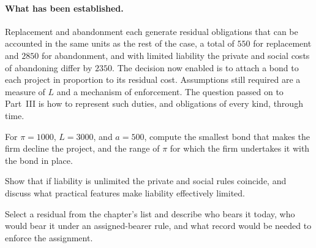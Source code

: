 \paragraph{What has been established.} Replacement and abandonment each generate residual obligations that can be accounted in the same units as the rest of the case, a total of $550$ for replacement and $2850$ for abandonment, and with limited liability the private and social costs of abandoning differ by $2350$. The decision now enabled is to attach a bond to each project in proportion to its residual cost. Assumptions still required are a measure of $L$ and a mechanism of enforcement. The question passed on to Part~III is how to represent such duties, and obligations of every kind, through time.

\begin{exercise}
For $\pi=1000$, $L=3000$, and $a=500$, compute the smallest bond that makes the firm decline the project, and the range of $\pi$ for which the firm undertakes it with the bond in place.
\end{exercise}
\begin{exercise}
Show that if liability is unlimited the private and social rules coincide, and discuss what practical features make liability effectively limited.
\end{exercise}
\begin{exercise}
Select a residual from the chapter's list and describe who bears it today, who would bear it under an assigned-bearer rule, and what record would be needed to enforce the assignment.
\end{exercise}
